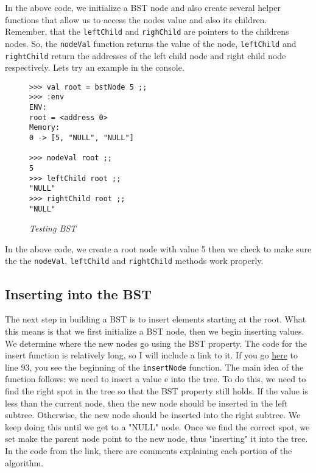\documentclass{article}
\begin{document}
\medskip\noindent
In the above code, we initialize a BST node and also create several helper functions that allow us to access the nodes value and also its children. Remember, that the \texttt{leftChild} and \texttt{righChild} are pointers to the childrens nodes. So, the \texttt{nodeVal} function returns the value of the node, \texttt{leftChild} and \texttt{rightChild} return the addresses of the left child node and right child node respectively. Lets try an example in the console.

\begin{figure}[H]
    \begin{lstlisting}
>>> val root = bstNode 5 ;;
>>> :env
ENV:
root = <address 0>
Memory:
0 -> [5, "NULL", "NULL"]

>>> nodeVal root ;;
5
>>> leftChild root ;;
"NULL"
>>> rightChild root ;;
"NULL"
    \end{lstlisting}
    \caption{\textit{Testing BST}}
\end{figure}

\noindent
In the above code, we create a root node with value 5 then we check to make sure the the \texttt{nodeVal}, \texttt{leftChild} and \texttt{rightChild} methods work properly.

\subsection{Inserting into the BST}

\medskip\noindent
The next step in building a BST is to insert elements starting at the root. What this means is that we first initialize a BST node, then we begin inserting values. We determine where the new nodes go using the BST property. The code for the insert function is relatively long, so I will include a link to it. If you go  \href{https://github.com/michaelkulinich/Programming_Languages/blob/main/report/miniProject.lc}{here} to line 93, you see the beginning of the \texttt{insertNode} function. The main idea of the function follows: we need to insert a value e into the tree. To do this, we need to find the right spot in the tree so that the BST property still holds. If the value is less than the current node, then the new node should be inserted in the left subtree. Otherwise, the new node should be inserted into the right subtree. We keep doing this until we get to a "NULL" node. Once we find the correct spot, we set make the parent node point to the new node, thus "inserting" it into the tree. In the code from the link, there are comments explaining each portion of the algorithm.
\end{document}
